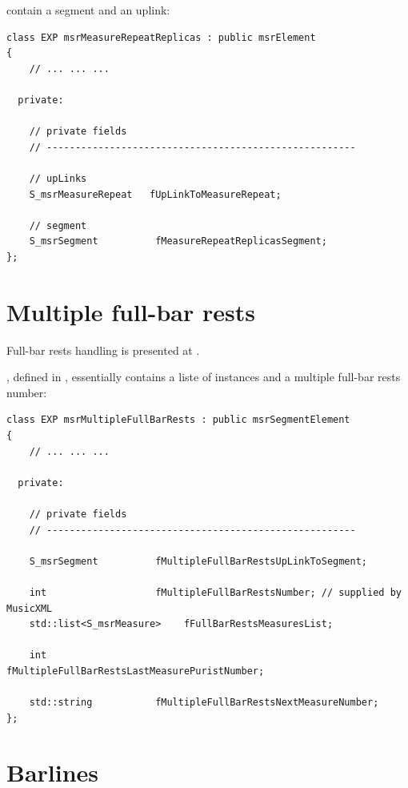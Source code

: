  contain a segment and an uplink:
\begin{lstlisting}[language=CPlusPlus]
class EXP msrMeasureRepeatReplicas : public msrElement
{
	// ... ... ...

  private:

    // private fields
    // ------------------------------------------------------

    // upLinks
    S_msrMeasureRepeat   fUpLinkToMeasureRepeat;

    // segment
    S_msrSegment          fMeasureRepeatReplicasSegment;
};
\end{lstlisting}


\section{Multiple full-bar rests}\label{Multiple full-bar rests}

Full-bar rests handling is presented at .

, defined in , essentially contains a liste of  instances and a multiple full-bar rests number:
\begin{lstlisting}[language=CPlusPlus]
class EXP msrMultipleFullBarRests : public msrSegmentElement
{
	// ... ... ...

  private:

    // private fields
    // ------------------------------------------------------

    S_msrSegment          fMultipleFullBarRestsUpLinkToSegment;

    int                   fMultipleFullBarRestsNumber; // supplied by MusicXML
    std::list<S_msrMeasure>    fFullBarRestsMeasuresList;

    int                   fMultipleFullBarRestsLastMeasurePuristNumber;

    std::string           fMultipleFullBarRestsNextMeasureNumber;
};
\end{lstlisting}


\section{Barlines}\label{Barlines}


